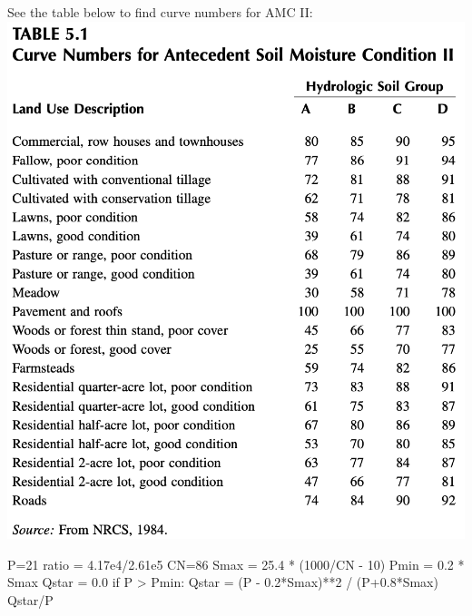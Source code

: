 \documentclass[
  letterpaper,
  DIV=11,
  numbers=noendperiod]{scrreprt}
\newenvironment{Shaded}{\begin{snugshade}}{\end{snugshade}}
\newcommand{\ControlFlowTok}[1]{\textcolor[rgb]{0.00,0.23,0.31}{#1}}
\newcommand{\DecValTok}[1]{\textcolor[rgb]{0.68,0.00,0.00}{#1}}
\newcommand{\FloatTok}[1]{\textcolor[rgb]{0.68,0.00,0.00}{#1}}
\newcommand{\NormalTok}[1]{\textcolor[rgb]{0.00,0.23,0.31}{#1}}
\newcommand{\OperatorTok}[1]{\textcolor[rgb]{0.37,0.37,0.37}{#1}}
\begin{document}
See the table below to find curve numbers for AMC II:
\includegraphics{archive/figures/ward-table5.1.png}

\begin{Shaded}
\begin{Highlighting}[]
\NormalTok{P}\OperatorTok{=}\DecValTok{21}
\NormalTok{ratio }\OperatorTok{=} \FloatTok{4.17e4}\OperatorTok{/}\FloatTok{2.61e5}
\NormalTok{CN}\OperatorTok{=}\DecValTok{86}
\NormalTok{Smax }\OperatorTok{=} \FloatTok{25.4} \OperatorTok{*}\NormalTok{ (}\DecValTok{1000}\OperatorTok{/}\NormalTok{CN }\OperatorTok{{-}} \DecValTok{10}\NormalTok{)}
\NormalTok{Pmin }\OperatorTok{=} \FloatTok{0.2} \OperatorTok{*}\NormalTok{ Smax}
\NormalTok{Qstar }\OperatorTok{=} \FloatTok{0.0}
\ControlFlowTok{if}\NormalTok{ P }\OperatorTok{\textgreater{}}\NormalTok{ Pmin:}
\NormalTok{    Qstar }\OperatorTok{=}\NormalTok{ (P }\OperatorTok{{-}} \FloatTok{0.2}\OperatorTok{*}\NormalTok{Smax)}\OperatorTok{**}\DecValTok{2} \OperatorTok{/}\NormalTok{ (P}\OperatorTok{+}\FloatTok{0.8}\OperatorTok{*}\NormalTok{Smax)}
\NormalTok{Qstar}\OperatorTok{/}\NormalTok{P}
\end{Highlighting}
\end{Shaded}
\end{document}
